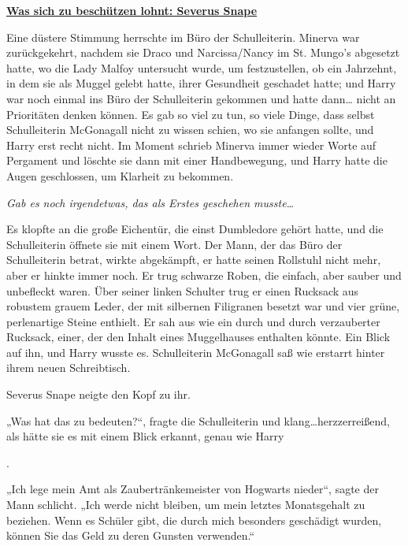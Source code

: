 

\hypertarget{was-sich-zu-beschuxfctzen-lohnt-severus-snape}{%

\textbf{\uline{Was sich zu beschützen lohnt: Severus Snape}}

Eine düstere Stimmung herrschte im Büro der Schulleiterin. Minerva war zurückgekehrt, nachdem sie Draco und Narcissa/Nancy im St. Mungo's abgesetzt hatte, wo die Lady Malfoy untersucht wurde, um festzustellen, ob ein Jahrzehnt, in dem sie als Muggel gelebt hatte, ihrer Gesundheit geschadet hatte; und Harry war noch einmal ins Büro der Schulleiterin gekommen und hatte dann… nicht an Prioritäten denken können. Es gab so viel zu tun, so viele Dinge, dass selbst Schulleiterin McGonagall nicht zu wissen schien, wo sie anfangen sollte, und Harry erst recht nicht. Im Moment schrieb Minerva immer wieder Worte auf Pergament und löschte sie dann mit einer Handbewegung, und Harry hatte die Augen geschlossen, um Klarheit zu bekommen.

\emph{\hfill\break Gab es noch irgendetwas, das als Erstes geschehen musste…}

Es klopfte an die große Eichentür, die einst Dumbledore gehört hatte, und die Schulleiterin öffnete sie mit einem Wort. Der Mann, der das Büro der Schulleiterin betrat, wirkte abgekämpft, er hatte seinen Rollstuhl nicht mehr, aber er hinkte immer noch. Er trug schwarze Roben, die einfach, aber sauber und unbefleckt waren. Über seiner linken Schulter trug er einen Rucksack aus robustem grauem Leder, der mit silbernen Filigranen besetzt war und vier grüne, perlenartige Steine enthielt. Er sah aus wie ein durch und durch verzauberter Rucksack, einer, der den Inhalt eines Muggelhauses enthalten könnte. Ein Blick auf ihn, und Harry wusste es. Schulleiterin McGonagall saß wie erstarrt hinter ihrem neuen Schreibtisch.

Severus Snape neigte den Kopf zu ihr.

„Was hat das zu bedeuten?“, fragte die Schulleiterin und klang…herzzerreißend, als hätte sie es mit einem Blick erkannt, genau wie Harry

.

„Ich lege mein Amt als Zaubertränkemeister von Hogwarts nieder“, sagte der Mann schlicht. „Ich werde nicht bleiben, um mein letztes Monatsgehalt zu beziehen. Wenn es Schüler gibt, die durch mich besonders geschädigt wurden, können Sie das Geld zu deren Gunsten verwenden.“

}
